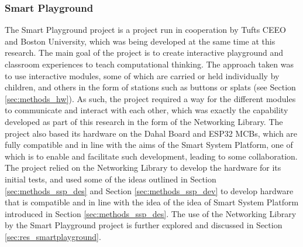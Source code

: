 

\subsubsection{\label{sec:methods_smart_playground}Smart Playground}
The Smart Playground project is a project run in cooperation by Tufts CEEO and Boston University, which was being developed at the same time at this research. The main goal of the project is to create interactive playground and classroom experiences to teach computational thinking. The approach taken was to use interactive modules, some of which are carried or held individually by children, and others in the form of stations such as buttons or splats (see Section \ref{sec:methods_hw}). As such, the project required a way for the different modules to communicate and interact with each other, which was exactly the capability developed as part of this research in the form of the Networking Library. The project also based its hardware on the Dahal Board and ESP32 MCBs, which are fully compatible and in line with the aims of the Smart System Platform, one of which is to enable and facilitate such development, leading to some collaboration. The project relied on the Networking Library to develop the hardware for its initial tests, and used some of the ideas outlined in Section \ref{sec:methods_ssp_des} and Section \ref{sec:methods_ssp_dev} to develop hardware that is compatible and in line with the idea of the idea of Smart System Platform introduced in Section \ref{sec:methods_ssp_des}. The use of the Networking Library by the Smart Playground project is further explored and discussed in Section \ref{sec:res_smartplayground}.
